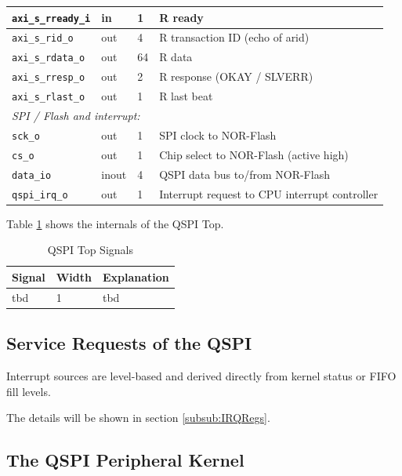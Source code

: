 \begin{table}[H]
\begin{tabularx}{\textwidth}{|l|l|l|X|}
  \hline
  \texttt{axi\_s\_rready\_i}  & in  & 1  & R ready \\
  \hline
  \texttt{axi\_s\_rid\_o}     & out & 4  & R transaction ID (echo of arid) \\
  \hline
  \texttt{axi\_s\_rdata\_o}   & out & 64 & R data \\
  \hline
  \texttt{axi\_s\_rresp\_o}   & out & 2  & R response (OKAY / SLVERR) \\
  \hline
  \texttt{axi\_s\_rlast\_o}   & out & 1  & R last beat \\
  \hline
  \multicolumn{4}{|l|}{\textit{SPI / Flash and interrupt:}} \\
  \hline
  \texttt{sck\_o}       & out & 1  & SPI clock to NOR-Flash \\
  \hline
  \texttt{cs\_o}        & out & 1  & Chip select to NOR-Flash (active high) \\
  \hline
  \texttt{data\_io}     & inout & 4 & QSPI data bus to/from NOR-Flash \\
  \hline
  \texttt{qspi\_irq\_o} & out & 1  & Interrupt request to CPU interrupt controller \\
  \hline
\end{tabularx}
\end{table}

Table \ref{tab:asQspiPer06a} shows the internals  of the QSPI Top.
\begin{table}[H]
\caption{QSPI Top Signals}
\label{tab:asQspiPer06a}
\centering
\begin{tabularx}{\textwidth}{|l |l |X|}
  \hline
  Signal & Width & Explanation \\
  \hline
  \hline
  tbd  & 1 & tbd \\
  \hline
\end{tabularx}
\end{table}

\subsection{Service Requests of the QSPI}
Interrupt sources are level-based and derived directly from kernel status
or FIFO fill levels.

The details will be shown in section \ref{subsub:IRQRegs}.


\subsection{The QSPI Peripheral Kernel}
\label{subsec:qspifunc02}
